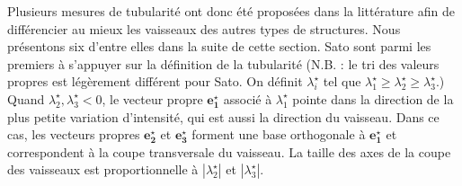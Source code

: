 Plusieurs mesures de tubularité ont donc été proposées dans la littérature afin de différencier au mieux les vaisseaux des autres types de structures. Nous présentons six d'entre elles dans la suite de cette section.
Sato \etal \cite{Sato1998_vesselness} sont parmi les premiers à s'appuyer sur la définition de la tubularité  (N.B. : le tri des valeurs propres est légèrement différent pour Sato. On définit $\lambda^\star_i$ tel que $\lambda^\star_1 \geqslant \lambda^\star_2  \geqslant  \lambda^\star_3$.)
Quand $\lambda^\star_2, \lambda^\star_3 < 0$, le vecteur propre $\mathbf {e^\star_1}$ associé à $\lambda^\star_1$ pointe dans la direction de la plus petite variation d'intensité, qui est aussi la direction du vaisseau.
Dans ce cas, les vecteurs propres $\mathbf {e^\star_2}$ et $\mathbf {e^\star_3}$ forment une base orthogonale à $\mathbf {e^\star_1}$ et correspondent à la coupe transversale du vaisseau.
La taille des axes de la coupe des vaisseaux est proportionnelle à $|\lambda^\star_2|$ et $|\lambda^\star_3|$.

